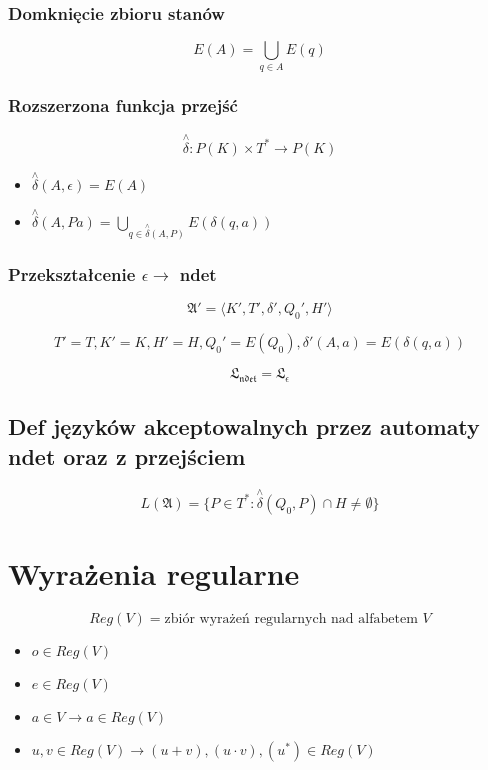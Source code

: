 \documentclass{../notatki}
\begin{document}
\subsubsection{Domknięcie zbioru stanów}

$$
E(A) = \bigcup_{q \in A}E(q)
$$

\subsubsection{Rozszerzona funkcja przejść}

$$
\stackrel{\wedge}{\delta}: P(K) \times T^* \rightarrow P(K)
$$

\begin{itemize}
    \item $\stackrel{\wedge}{\delta}(A, \epsilon) = E(A)$
    \item $\stackrel{\wedge}{\delta}(A, Pa) = \bigcup_{q \in \stackrel{\wedge}{\delta}(A, P)}E(\delta(q, a))$
\end{itemize}

\subsubsection{Przekształcenie \texorpdfstring{$\epsilon \rightarrow$}{->} ndet}

$$
\mathfrak{A}' = \langle K',T',\delta',Q_0',H' \rangle
$$

$$
T' = T, K' = K, H' = H, Q_0' = E(Q_0), \delta'(A, a) = E(\delta(q, a))
$$

$$
\mathfrak{L_{ndet} = \mathfrak{L_{\epsilon}}}
$$

\subsection{Def języków akceptowalnych przez automaty ndet oraz z przejściem}

$$
L(\mathfrak{A}) = \{P \in T^* : \stackrel{\wedge}{\delta}(Q_0, P) \cap H \ne \emptyset\}
$$

\section{Wyrażenia regularne}

$$
Reg(V) = \text{zbiór wyrażeń regularnych nad alfabetem } V
$$

\begin{itemize}
    \item $o \in Reg(V)$
    \item $e \in Reg(V)$
    \item $a \in V \rightarrow a \in Reg(V)$
    \item $u, v \in Reg(V) \rightarrow (u + v), (u \cdot v), (u^*) \in Reg(V)$
\end{itemize}
\end{document}
